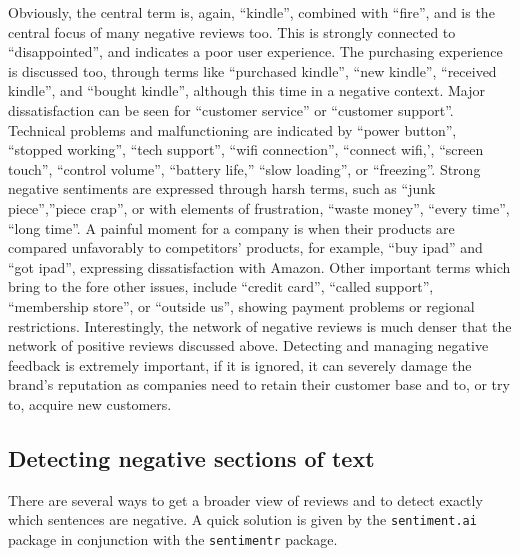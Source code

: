 Obviously, the central term is, again, ``kindle'', combined with ``fire'',
and is the central focus of many negative reviews too. This is
strongly connected to ``disappointed'', and indicates a poor user experience.
The purchasing experience is discussed too, through terms like ``purchased
kindle'', ``new kindle'', ``received kindle'', and ``bought kindle'', although this
time in a negative context. Major dissatisfaction can be seen for
``customer service'' or ``customer support''. Technical problems and
malfunctioning are indicated by ``power button'', ``stopped
working'', ``tech support'', ``wifi connection'', ``connect wifi,',
``screen touch'', ``control volume'', ``battery life,'' ``slow
loading'', or ``freezing''. Strong negative sentiments are expressed
through harsh terms, such as ``junk piece'',''piece crap'', or with
elements of frustration, ``waste money'', ``every time'', ``long
time''. A painful moment for a company is when their products are
compared unfavorably to competitors' products, for example, ``buy ipad'' and ``got ipad'', expressing dissatisfaction with Amazon. Other
important terms which bring to the fore other issues, include ``credit card'', ``called
support'', ``membership store'', or ``outside us'', showing payment
problems or regional restrictions. Interestingly, the network of
negative reviews is much denser that the network of
positive reviews discussed above. Detecting and managing negative feedback is extremely
important, if it is ignored, it can severely damage the brand's reputation as
companies need to retain their customer base and to, or try to, acquire new
customers.

\subsection{Detecting negative sections of text}\label{negative-text-sections-detection}

There are several ways to get a broader view of reviews and to detect exactly which sentences are negative. A quick
solution is given by the \texttt{sentiment.ai}
package in conjunction with the \texttt{sentimentr} package.

